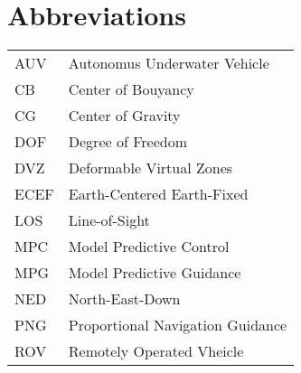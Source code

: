 \chapter{Abbreviations}
\begin{center}
\begin{tabular}{|l|l|}
\hline
AUV & Autonomus Underwater Vehicle \\
CB & Center of Bouyancy\\
CG & Center of Gravity \\
DOF & Degree of Freedom \\
DVZ & Deformable Virtual Zones \\
ECEF & Earth-Centered Earth-Fixed \\
LOS & Line-of-Sight\\
MPC & Model Predictive Control \\
MPG & Model Predictive Guidance\\
NED & North-East-Down \\
PNG & Proportional Navigation Guidance \\
ROV & Remotely Operated Vheicle \\
\hline
\end{tabular}
\end{center}
